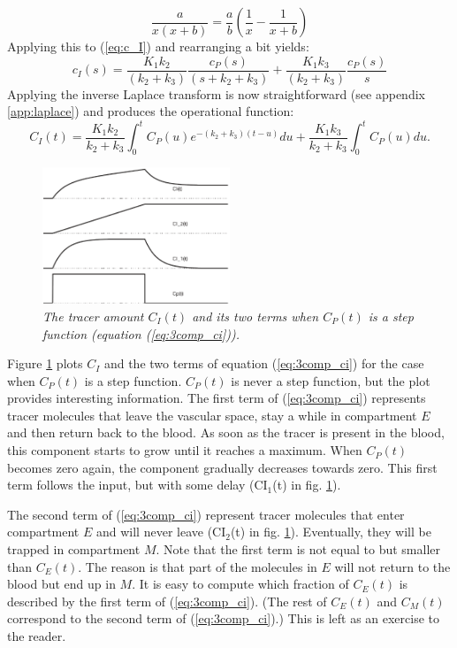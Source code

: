 \begin{equation}
  \frac{a}{x(x + b)} = \frac{a}{b} \left( \frac{1}{x} - \frac{1}{x+b} \right)
\end{equation}
Applying this to (\ref{eq:c_I}) and rearranging a bit yields:
\begin{equation}
  c_I(s) = \frac{K_1 k_2}{(k_2 + k_3)} \frac{c_P(s)}{(s + k_2 + k_3)} + 
           \frac{K_1 k_3}{(k_2 + k_3)} \frac{c_P(s)}{s}
\end{equation}
Applying the inverse Laplace transform is now straightforward (see appendix
\ref{app:laplace}) and produces the operational function:
\begin{equation}
  C_I(t) = \frac{K_1 k_2}{k_2 + k_3} \int_0^t C_P(u) e^{-(k_2 + k_3)(t - u)}du
         + \frac{K_1 k_3}{k_2 + k_3} \int_0^t C_P(u) du. \label{eq:3comp_ci}
\end{equation}

\begin{figure}[tb]
\centering
\includegraphics[width=0.5\textwidth]{figs/fig_3comp_ci.pdf}
\caption{\label{fig:3comp_ci} \emph{The tracer amount $C_I(t)$ and its two
terms when $C_P(t)$ is a step function (equation (\ref{eq:3comp_ci})).}}
\end{figure}
%
Figure \ref{fig:3comp_ci} plots $C_I$ and the two terms of equation
(\ref{eq:3comp_ci}) for the case when $C_P(t)$ is a step function. $C_P(t)$ is
never a step function, but the plot provides interesting information. The
first term of (\ref{eq:3comp_ci}) represents tracer molecules that leave the
vascular space, stay a while in compartment $E$ and then return back to the
blood. As soon as the tracer is present in the blood, this component starts to
grow until it reaches a maximum. When $C_P(t)$ becomes zero again, the
component gradually decreases towards zero. This first term follows the input,
but with some delay (CI$_1$(t) in fig. \ref{fig:3comp_ci}).

The second term of (\ref{eq:3comp_ci}) represent tracer molecules that
enter compartment $E$ and will never leave (CI$_2$(t) in
fig. \ref{fig:3comp_ci}). Eventually, they will be trapped in
compartment $M$. Note that the first term is not equal to but smaller
than $C_E(t)$. The reason is that part of the molecules in $E$ will
not return to the blood but end up in $M$. It is easy to compute which
fraction of $C_E(t)$ is described by the first term of
(\ref{eq:3comp_ci}). (The rest of $C_E(t)$ and $C_M(t)$ correspond to
the second term of (\ref{eq:3comp_ci}).) This is left as an exercise
to the reader.

